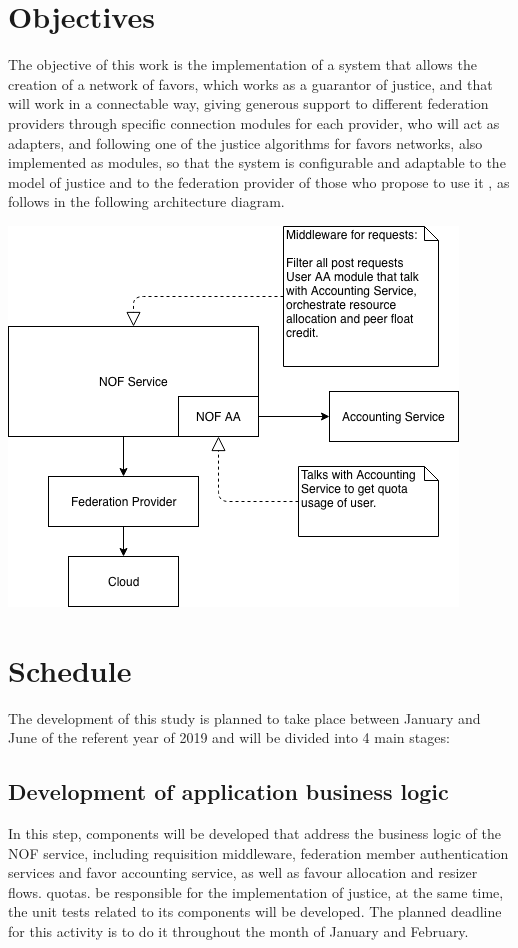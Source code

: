 \documentclass{article}
\begin{document}
\section{Objectives}
The objective of this work is the implementation of a system that allows the creation of a network of favors, which works as a guarantor of justice, and that will work in a connectable way, giving generous support to different federation providers through specific connection modules for each provider, who will act as adapters, and following one of the justice algorithms for favors networks, also implemented as modules, so that the system is configurable and adaptable to the model of justice and to the federation provider of those who propose to use it , as follows in the following architecture diagram.

\begin{center}
\includegraphics[scale=0.4]{./image/NOF-architecture-generic.png}
\end{center}

\section{Schedule}

The development of this study is planned to take place between January and June of the referent year of 2019 and will be divided into 4 main stages:
\subsection{Development of application business logic}
	In this step, components will be developed that address the business logic of the NOF service, including requisition middleware, federation member authentication services and favor accounting service, as well as favour allocation and resizer flows. quotas. be responsible for the implementation of justice, at the same time, the unit tests related to its components will be developed. The planned deadline for this activity is to do it throughout the month of January and February.
\end{document}
